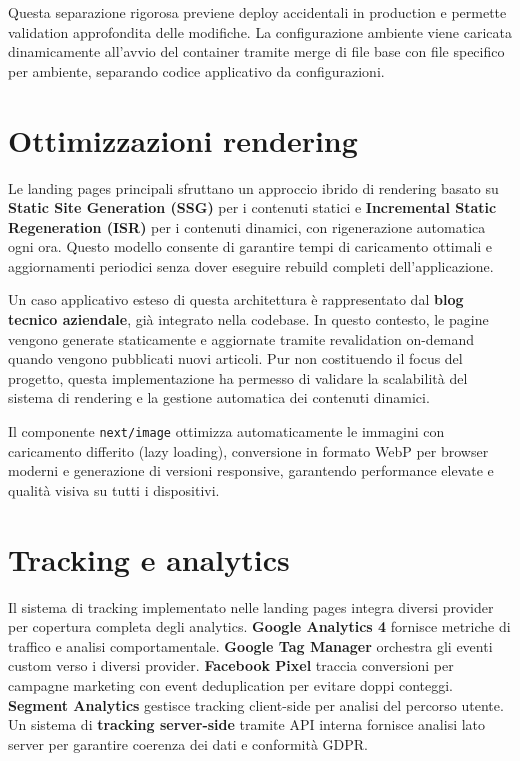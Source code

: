 Questa separazione rigorosa previene deploy accidentali in production e permette 
validation approfondita delle modifiche. La configurazione ambiente viene caricata 
dinamicamente all'avvio del container tramite merge di file base con file specifico 
per ambiente, separando codice applicativo da configurazioni.

\section{Ottimizzazioni rendering}

Le landing pages principali sfruttano un approccio ibrido di rendering basato su 
\textbf{Static Site Generation (SSG)} per i contenuti statici e 
\textbf{Incremental Static Regeneration (ISR)} per i contenuti dinamici, 
con rigenerazione automatica ogni ora. Questo modello consente di garantire tempi 
di caricamento ottimali e aggiornamenti periodici senza dover eseguire rebuild 
completi dell'applicazione.

Un caso applicativo esteso di questa architettura è rappresentato dal 
\textbf{blog tecnico aziendale}, già integrato nella codebase. In questo contesto, 
le pagine vengono generate staticamente e aggiornate tramite revalidation on-demand 
quando vengono pubblicati nuovi articoli. Pur non costituendo il focus del progetto, 
questa implementazione ha permesso di validare la scalabilità del sistema di 
rendering e la gestione automatica dei contenuti dinamici.

Il componente \texttt{next/image} ottimizza automaticamente le immagini con 
caricamento differito (lazy loading), conversione in formato WebP per browser 
moderni e generazione di versioni responsive, garantendo performance elevate 
e qualità visiva su tutti i dispositivi.

\section{Tracking e analytics}

Il sistema di tracking implementato nelle landing pages integra diversi provider 
per copertura completa degli analytics. \textbf{Google Analytics 4} fornisce 
metriche di traffico e analisi comportamentale. \textbf{Google Tag Manager} 
orchestra gli eventi custom verso i diversi provider. \textbf{Facebook Pixel} 
traccia conversioni per campagne marketing con event deduplication per evitare 
doppi conteggi. \textbf{Segment Analytics} gestisce tracking client-side per 
analisi del percorso utente. Un sistema di \textbf{tracking server-side} tramite 
API interna fornisce analisi lato server per garantire coerenza dei dati e 
conformità GDPR.

